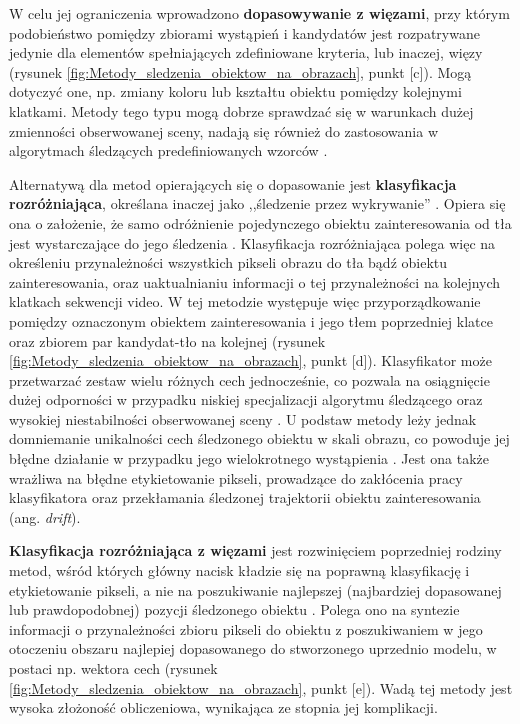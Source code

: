 W celu jej ograniczenia wprowadzono \textbf{dopasowywanie z więzami}, przy którym podobieństwo pomiędzy zbiorami wystąpień i kandydatów jest rozpatrywane jedynie dla elementów spełniających zdefiniowane kryteria, lub inaczej, więzy (rysunek \ref{fig:Metody_sledzenia_obiektow_na_obrazach}, punkt [c]). Mogą dotyczyć one, np. zmiany koloru lub kształtu obiektu pomiędzy kolejnymi klatkami. Metody tego typu mogą dobrze sprawdzać się w warunkach dużej zmienności obserwowanej sceny, nadają się również do zastosowania w algorytmach śledzących predefiniowanych wzorców \cite{Smeulders2010}.

Alternatywą dla metod opierających się o dopasowanie jest \textbf{klasyfikacja rozróżniająca}, określana inaczej jako ,,śledzenie przez wykrywanie'' \cite{Smeulders2010}. Opiera się ona o założenie, że samo odróżnienie pojedynczego obiektu zainteresowania od tła jest wystarczające do jego śledzenia \cite{Smeulders2010}. Klasyfikacja rozróżniająca polega więc na określeniu przynależności wszystkich pikseli obrazu do tła bądź obiektu zainteresowania, oraz uaktualnianiu informacji o tej przynależności na kolejnych klatkach sekwencji video. W tej metodzie występuje więc przyporządkowanie pomiędzy oznaczonym obiektem zainteresowania i jego tłem poprzedniej klatce oraz zbiorem par kandydat-tło na kolejnej (rysunek \ref{fig:Metody_sledzenia_obiektow_na_obrazach}, punkt [d]). Klasyfikator może przetwarzać zestaw wielu różnych cech jednocześnie, co pozwala na osiągnięcie dużej odporności w przypadku niskiej specjalizacji algorytmu śledzącego oraz wysokiej niestabilności obserwowanej sceny \cite{Smeulders2010}. U podstaw metody leży jednak domniemanie unikalności cech śledzonego obiektu w skali obrazu, co powoduje jej błędne działanie w przypadku jego wielokrotnego wystąpienia \cite{Smeulders2010}. Jest ona także wrażliwa na błędne etykietowanie pikseli, prowadzące do zakłócenia pracy klasyfikatora oraz przekłamania śledzonej trajektorii obiektu zainteresowania (ang. \textit{drift}).  

\textbf{Klasyfikacja rozróżniająca z więzami} jest rozwinięciem poprzedniej rodziny metod, wśród których główny nacisk kładzie się na poprawną klasyfikację i etykietowanie pikseli, a nie na poszukiwanie najlepszej (najbardziej dopasowanej lub prawdopodobnej) pozycji śledzonego obiektu \cite{Smeulders2010}. Polega ono na syntezie informacji o przynależności zbioru pikseli do obiektu z poszukiwaniem w jego otoczeniu obszaru najlepiej dopasowanego do stworzonego uprzednio modelu, w postaci np. wektora cech (rysunek \ref{fig:Metody_sledzenia_obiektow_na_obrazach}, punkt [e]). Wadą tej metody jest wysoka złożoność obliczeniowa, wynikająca ze stopnia jej komplikacji.


